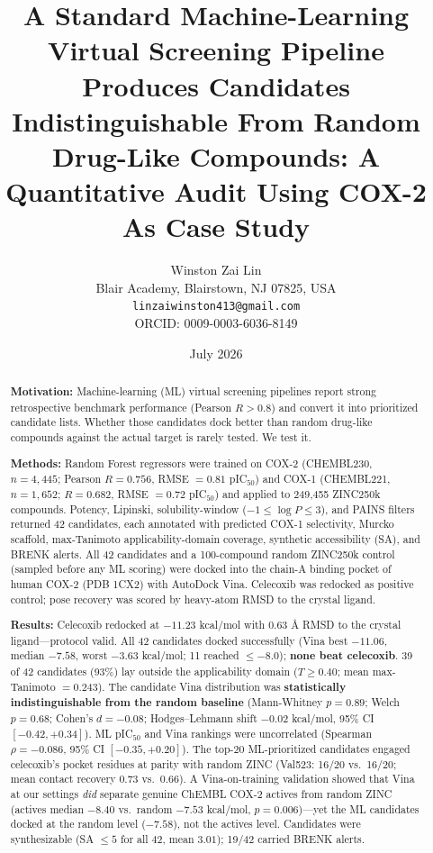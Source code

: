 \documentclass[11pt]{article}
\title{A Standard Machine-Learning Virtual Screening Pipeline Produces Candidates Indistinguishable From Random Drug-Like Compounds: A Quantitative Audit Using COX-2 As Case Study}
\author{
Winston Zai Lin \\
Blair Academy, Blairstown, NJ 07825, USA \\
\texttt{linzaiwinston413@gmail.com} \\
ORCID: 0009-0003-6036-8149
}
\date{July 2026}
\begin{document}
\maketitle

\begin{abstract}

\noindent\textbf{Motivation:}
Machine-learning (ML) virtual screening pipelines report strong retrospective benchmark performance (Pearson $R > 0.8$) and convert it into prioritized candidate lists. Whether those candidates dock better than random drug-like compounds against the actual target is rarely tested. We test it.

\noindent\textbf{Methods:}
Random Forest regressors were trained on COX-2 (CHEMBL230, $n=4{,}445$; Pearson $R=0.756$, RMSE $=0.81$ pIC$_{50}$) and COX-1 (CHEMBL221, $n=1{,}652$; $R=0.682$, RMSE $=0.72$ pIC$_{50}$) and applied to 249{,}455 ZINC250k compounds. Potency, Lipinski, solubility-window ($-1 \leq \log P \leq 3$), and PAINS filters returned 42 candidates, each annotated with predicted COX-1 selectivity, Murcko scaffold, max-Tanimoto applicability-domain coverage, synthetic accessibility (SA), and BRENK alerts. All 42 candidates and a 100-compound random ZINC250k control (sampled before any ML scoring) were docked into the chain-A binding pocket of human COX-2 (PDB 1CX2) with AutoDock Vina. Celecoxib was redocked as positive control; pose recovery was scored by heavy-atom RMSD to the crystal ligand.

\noindent\textbf{Results:}
Celecoxib redocked at $-11.23$ kcal/mol with 0.63 \r{A} RMSD to the crystal ligand---protocol valid. All 42 candidates docked successfully (Vina best $-11.06$, median $-7.58$, worst $-3.63$ kcal/mol; 11 reached $\leq -8.0$); \textbf{none beat celecoxib}. 39 of 42 candidates (93\%) lay outside the applicability domain ($T \geq 0.40$; mean max-Tanimoto $= 0.243$). The candidate Vina distribution was \textbf{statistically indistinguishable from the random baseline} (Mann-Whitney $p = 0.89$; Welch $p = 0.68$; Cohen's $d = -0.08$; Hodges--Lehmann shift $-0.02$ kcal/mol, 95\% CI $[-0.42, +0.34]$). ML pIC$_{50}$ and Vina rankings were uncorrelated (Spearman $\rho = -0.086$, 95\% CI $[-0.35, +0.20]$). The top-20 ML-prioritized candidates engaged celecoxib's pocket residues at parity with random ZINC (Val523: 16/20 vs.\ 16/20; mean contact recovery $0.73$ vs.\ $0.66$). A Vina-on-training validation showed that Vina at our settings \emph{did} separate genuine ChEMBL COX-2 actives from random ZINC (actives median $-8.40$ vs.\ random $-7.53$ kcal/mol, $p = 0.006$)---yet the ML candidates docked at the random level ($-7.58$), not the actives level. Candidates were synthesizable (SA $\leq 5$ for all 42, mean $3.01$); 19/42 carried BRENK alerts.


\end{abstract}
\end{document}
